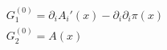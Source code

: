 \begin{equation}
 \begin{array}{l}
 G_1^{(0)}= \partial_i A_i'(x)-\partial_i\partial_i\pi(x) \\ G_2
 ^{(0)}= A(x)
 \end{array}
 \label{a48}
 \end{equation}

